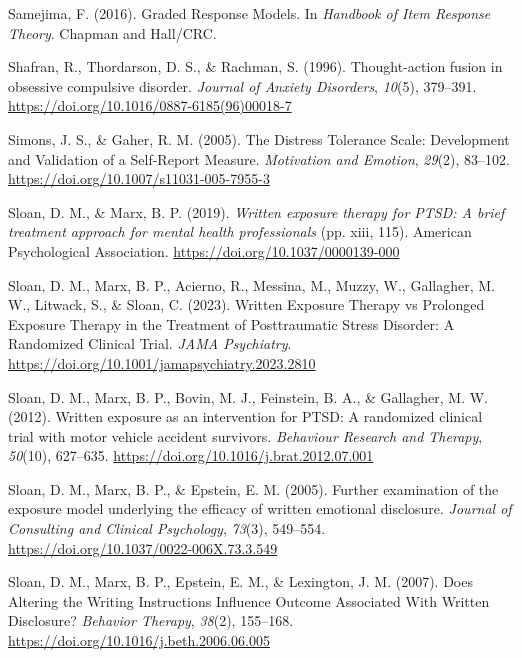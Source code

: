 \documentclass[
  man,floatsintext]{apa7}
\newlength{\cslhangindent}
\newlength{\cslentryspacingunit} %
\newenvironment{CSLReferences}[2] %
 {%
  \setlength{\parindent}{0pt}
  \ifodd #1
  \let\oldpar\par
  \def\par{\hangindent=\cslhangindent\oldpar}
  \fi
  \setlength{\parskip}{#2\cslentryspacingunit}
 }%
 {}
\begin{document}
\begin{CSLReferences}{1}{0}
\leavevmode{}%
Samejima, F. (2016). Graded Response Models. In \emph{Handbook of Item Response Theory}. Chapman and Hall/CRC.

\leavevmode{}%
Shafran, R., Thordarson, D. S., \& Rachman, S. (1996). Thought-action fusion in obsessive compulsive disorder. \emph{Journal of Anxiety Disorders}, \emph{10}(5), 379--391. \url{https://doi.org/10.1016/0887-6185(96)00018-7}

\leavevmode{}%
Simons, J. S., \& Gaher, R. M. (2005). The Distress Tolerance Scale: Development and Validation of a Self-Report Measure. \emph{Motivation and Emotion}, \emph{29}(2), 83--102. \url{https://doi.org/10.1007/s11031-005-7955-3}

\leavevmode{}%
Sloan, D. M., \& Marx, B. P. (2019). \emph{Written exposure therapy for PTSD: A brief treatment approach for mental health professionals} (pp. xiii, 115). American Psychological Association. \url{https://doi.org/10.1037/0000139-000}

\leavevmode{}%
Sloan, D. M., Marx, B. P., Acierno, R., Messina, M., Muzzy, W., Gallagher, M. W., Litwack, S., \& Sloan, C. (2023). Written Exposure Therapy vs Prolonged Exposure Therapy in the Treatment of Posttraumatic Stress Disorder: A Randomized Clinical Trial. \emph{JAMA Psychiatry}. \url{https://doi.org/10.1001/jamapsychiatry.2023.2810}

\leavevmode{}%
Sloan, D. M., Marx, B. P., Bovin, M. J., Feinstein, B. A., \& Gallagher, M. W. (2012). Written exposure as an intervention for PTSD: A randomized clinical trial with motor vehicle accident survivors. \emph{Behaviour Research and Therapy}, \emph{50}(10), 627--635. \url{https://doi.org/10.1016/j.brat.2012.07.001}

\leavevmode{}%
Sloan, D. M., Marx, B. P., \& Epstein, E. M. (2005). Further examination of the exposure model underlying the efficacy of written emotional disclosure. \emph{Journal of Consulting and Clinical Psychology}, \emph{73}(3), 549--554. \url{https://doi.org/10.1037/0022-006X.73.3.549}

\leavevmode{}%
Sloan, D. M., Marx, B. P., Epstein, E. M., \& Lexington, J. M. (2007). Does Altering the Writing Instructions Influence Outcome Associated With Written Disclosure? \emph{Behavior Therapy}, \emph{38}(2), 155--168. \url{https://doi.org/10.1016/j.beth.2006.06.005}


\end{CSLReferences}
\end{document}

